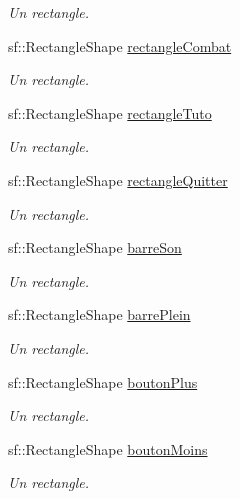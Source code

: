 \begin{DoxyCompactItemize}
\begin{DoxyCompactList}\small\item\em Un rectangle. \end{DoxyCompactList}\item 
sf\+::\+Rectangle\+Shape \hyperlink{class_s_f_m_l_menu_a0b71112f9f5fe621ffce9171c711ef7c}{rectangle\+Combat}
\begin{DoxyCompactList}\small\item\em Un rectangle. \end{DoxyCompactList}\item 
sf\+::\+Rectangle\+Shape \hyperlink{class_s_f_m_l_menu_ae3661f8b9196011676527adf88221d41}{rectangle\+Tuto}
\begin{DoxyCompactList}\small\item\em Un rectangle. \end{DoxyCompactList}\item 
sf\+::\+Rectangle\+Shape \hyperlink{class_s_f_m_l_menu_a37061fedec37dcaa42ba762b28ebdc9f}{rectangle\+Quitter}
\begin{DoxyCompactList}\small\item\em Un rectangle. \end{DoxyCompactList}\item 
sf\+::\+Rectangle\+Shape \hyperlink{class_s_f_m_l_menu_a82556c1a0294f342bf4400774148d29b}{barre\+Son}
\begin{DoxyCompactList}\small\item\em Un rectangle. \end{DoxyCompactList}\item 
sf\+::\+Rectangle\+Shape \hyperlink{class_s_f_m_l_menu_a04eaa093a1ac60b8d6d3c11f269675ab}{barre\+Plein}
\begin{DoxyCompactList}\small\item\em Un rectangle. \end{DoxyCompactList}\item 
sf\+::\+Rectangle\+Shape \hyperlink{class_s_f_m_l_menu_aeb1bec14619d34e543cd51154bd20867}{bouton\+Plus}
\begin{DoxyCompactList}\small\item\em Un rectangle. \end{DoxyCompactList}\item 
sf\+::\+Rectangle\+Shape \hyperlink{class_s_f_m_l_menu_a1e2ef0f6fcd9d526cdd778a04a7fc636}{bouton\+Moins}
\begin{DoxyCompactList}\small\item\em Un rectangle. \end{DoxyCompactList}\item 

\end{DoxyCompactItemize}
